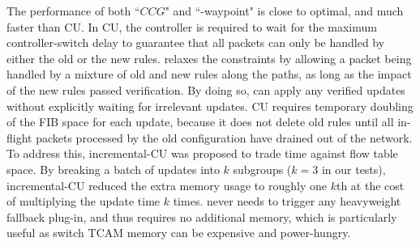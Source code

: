 The performance of both ``$CCG$" and ``\name-waypoint" is close to optimal, and much faster  than CU. %
In CU, the controller is required to wait for the maximum controller-switch delay to guarantee that all packets can only be handled by either the old or the new rules. 
\name relaxes the constraints by allowing a packet being handled by a mixture of old and new rules along the paths, as long as the impact of the new rules passed verification. By doing so, \name can apply any verified updates without explicitly waiting for irrelevant updates. 
CU requires temporary doubling of the FIB space for each update, %
because it does not delete old rules until all in-flight packets processed by the old configuration have drained out of the network. To address this, incremental-CU was proposed to trade time against flow table space. By breaking a batch of updates into $k$ subgroups ($k=3$ in our tests), incremental-CU reduced the extra memory usage to roughly one $k$th at the cost of multiplying the update time $k$ times. %
 \name never needs to trigger any heavyweight fallback plug-in, and thus requires no additional memory, which is particularly useful as switch TCAM memory can be expensive and power-hungry.

